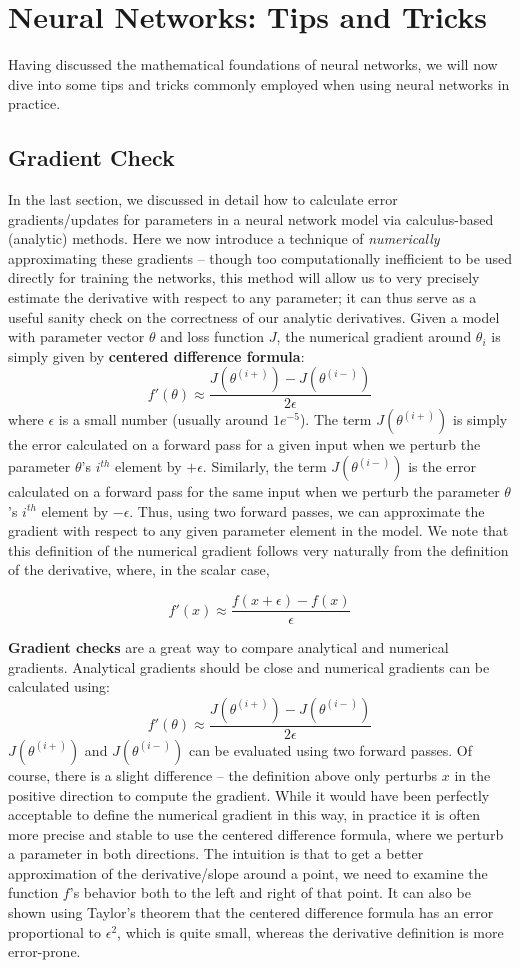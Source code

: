 \section{Neural Networks: Tips and Tricks}\label{sec:nnetstips}

Having discussed the mathematical foundations of neural networks, we will now dive into some tips and tricks commonly employed when using neural networks in practice.

\subsection{Gradient Check}
In the last section, we discussed in detail how to calculate error gradients/updates for parameters in a neural network model via calculus-based (analytic) methods. Here we now introduce a technique of \textit{numerically} approximating these gradients -- though too computationally inefficient to be used directly for training the networks, this method will allow us to very precisely estimate the derivative with respect to any parameter; it can thus serve as a useful sanity check on the correctness of our analytic derivatives. Given a model with parameter vector $\theta$ and loss function $J$, the numerical gradient around $\theta_i$ is simply given by \textbf{centered difference formula}:
$$ f'(\theta) \approx \frac{J(\theta^{(i+)}) - J(\theta^{(i-)})}{2 \epsilon}$$
where $\epsilon$ is a small number (usually around $1e^{-5}$). The term $J(\theta^{(i+)})$ is simply the error calculated on a forward pass for a given input when we perturb the parameter $\theta$'s $i^{th}$ element by $+\epsilon$. Similarly, the term $J(\theta^{(i-)})$ is the error calculated on a forward pass for the same input when we perturb the parameter $\theta$'s $i^{th}$ element by $-\epsilon$. Thus, using two forward passes, we can approximate the gradient with respect to any given parameter element in the model. We note that this definition of the numerical gradient follows very naturally from the definition of the derivative, where, in the scalar case,

$$f'(x) \approx \dfrac{f(x + \epsilon) - f(x)}{\epsilon}$$

\textbf{Gradient checks} are a great way to compare analytical and numerical gradients. Analytical gradients should be close and numerical gradients can be calculated using: $$ f'(\theta) \approx \frac{J(\theta^{(i+)}) - J(\theta^{(i-)})}{2 \epsilon}$$ $J(\theta^{(i+)})$ and $J(\theta^{(i-)})$ can be evaluated using two forward passes.
Of course, there is a slight difference -- the definition above only perturbs $x$ in the positive direction to compute the gradient. While it would have been perfectly acceptable to define the numerical gradient in this way, in practice it is often more precise and stable to use the {centered difference formula}, where we perturb a parameter in both directions. The intuition is that to get a better approximation of the derivative/slope around a point, we need to examine the function $f$'s behavior both to the left and right of that point. It can also be shown using Taylor's theorem that the centered difference formula has an error proportional to $\epsilon^2$, which is quite small, whereas the derivative definition is more error-prone.


